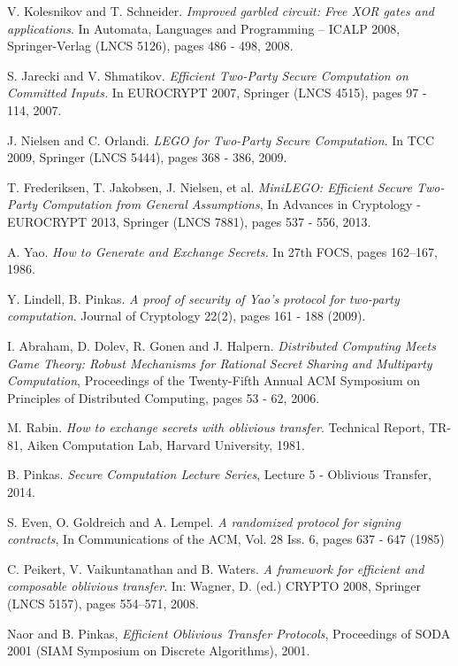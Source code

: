 \documentclass[ %
                    author={Nicholas Tutte},
                supervisor={Prof. Nigel Smart},
                    degree={MEng},
                     title={Secure Two Party Computation},
                  subtitle={A practical comparison of recent protocols},
                      type={Research - GG1K},
                      year={2015} ]{dissertation}
\begin{document}
\begin{thebibliography}{99}
			V. Kolesnikov and T. Schneider. \emph{Improved garbled circuit: Free XOR gates and applications}. In Automata, Languages and Programming – ICALP 2008, Springer-Verlag (LNCS 5126), pages 486 - 498, 2008.

			S. Jarecki and V. Shmatikov. \emph{Efficient Two-Party Secure Computation on Committed Inputs.} In EUROCRYPT 2007, Springer (LNCS 4515), pages 97 - 114, 2007.

			J. Nielsen and C. Orlandi. \emph{LEGO for Two-Party Secure Computation}. In TCC 2009, Springer (LNCS 5444), pages 368 - 386, 2009.

			T. Frederiksen, T. Jakobsen, J. Nielsen, et al. \emph{MiniLEGO: Efficient Secure Two-Party Computation from General Assumptions}, In Advances in Cryptology - EUROCRYPT 2013, Springer (LNCS 7881), pages 537 - 556, 2013.

			A. Yao. \emph{How to Generate and Exchange Secrets.} In 27th FOCS, pages 162–167, 1986.

			Y. Lindell, B. Pinkas. \emph{A proof of security of Yao’s protocol for two-party computation}. Journal of Cryptology 22(2), pages 161 - 188 (2009).

			I. Abraham, D. Dolev, R. Gonen and J. Halpern. \emph{Distributed Computing Meets Game Theory: Robust Mechanisms for Rational Secret Sharing and Multiparty Computation}, Proceedings of the Twenty-Fifth Annual ACM Symposium on Principles of Distributed Computing,  pages 53 - 62, 2006.

			M. Rabin. \emph{How to exchange secrets with oblivious transfer}. Technical Report, TR-81, Aiken Computation Lab, Harvard University, 1981.

			B. Pinkas. \emph{Secure Computation Lecture Series}, Lecture 5 - Oblivious Transfer, 2014.

			S. Even, O. Goldreich and A. Lempel. \emph{A randomized protocol for signing contracts}, In Communications of the ACM, Vol. 28 Iss. 6, pages 637 - 647 (1985)

			C. Peikert, V. Vaikuntanathan and B. Waters. \emph{A framework for efficient and composable oblivious transfer}. In: Wagner, D. (ed.) CRYPTO 2008, Springer (LNCS 5157), pages 554–571, 2008.

			Naor and B. Pinkas, \emph{Efficient Oblivious Transfer Protocols}, Proceedings of SODA 2001 (SIAM Symposium on Discrete Algorithms), 2001.


\end{thebibliography}
\end{document}

